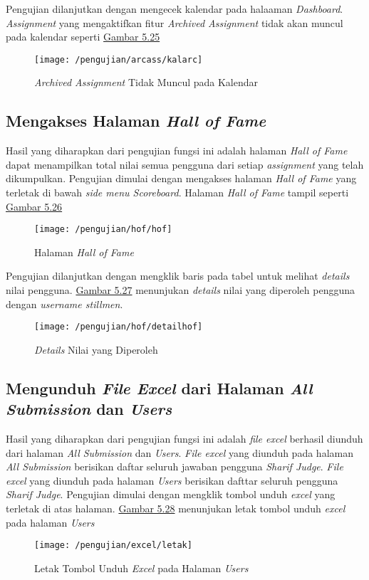 	Pengujian dilanjutkan dengan mengecek kalendar pada halaaman \textit{Dashboard}. \textit{Assignment} yang mengaktifkan fitur \textit{Archived Assignment} tidak akan muncul pada kalendar seperti \hyperref[fig:listarc]{Gambar 5.25}
	\begin{figure}[H]
		\centering  
		\texttt{[image: /pengujian/arcass/kalarc]}  
		\caption[\textit{Archived Assignment} Tidak Muncul pada Kalendar]{\textit{Archived Assignment} Tidak Muncul pada Kalendar} 
		\label{fig:kalarc} 
	\end{figure}

	\subsection{Mengakses Halaman \textit{Hall of Fame}}
	Hasil yang diharapkan dari pengujian fungsi ini adalah halaman \textit{Hall of Fame} dapat menampilkan total nilai semua pengguna dari setiap \textit{assignment} yang telah dikumpulkan. Pengujian dimulai dengan mengakses halaman \textit{Hall of Fame} yang terletak di bawah \textit{side menu Scoreboard}. Halaman \textit{Hall of Fame} tampil seperti \hyperref[fig:halhof]{Gambar 5.26}
	\begin{figure}[H]
		\centering  
		\texttt{[image: /pengujian/hof/hof]}  
		\caption[Halaman \textit{Hall of Fame}]{Halaman \textit{Hall of Fame}} 
		\label{fig:halhof} 
	\end{figure}

	Pengujian dilanjutkan dengan mengklik baris pada tabel untuk melihat \textit{details} nilai pengguna. \hyperref[fig:dethof]{Gambar 5.27} menunjukan \textit{details} nilai yang diperoleh pengguna dengan \textit{username stillmen}.
	\begin{figure}[H]
		\centering  
		\texttt{[image: /pengujian/hof/detailhof]}  
		\caption[\textit{Details} Nilai yang Diperoleh]{\textit{Details} Nilai yang Diperoleh} 
		\label{fig:dethof} 
	\end{figure}

	\subsection{Mengunduh \textit{File Excel} dari Halaman \textit{All Submission} dan \textit{Users}}
	Hasil yang diharapkan dari pengujian fungsi ini adalah \textit{file excel} berhasil diunduh dari halaman \textit{All Submission} dan \textit{Users}. \textit{File excel} yang diunduh pada halaman \textit{All Submission} berisikan daftar seluruh jawaban pengguna \textit{Sharif Judge}. \textit{File excel} yang diunduh pada halaman \textit{Users} berisikan dafttar seluruh pengguna \textit{Sharif Judge}. Pengujian dimulai dengan mengklik tombol unduh \textit{excel} yang terletak di atas halaman. \hyperref[fig:unduh]{Gambar 5.28} menunjukan letak tombol unduh \textit{excel} pada halaman \textit{Users}
	\begin{figure}[H]
		\centering  
		\texttt{[image: /pengujian/excel/letak]}  
		\caption[Letak Tombol Unduh \textit{Excel} pada Halaman \textit{Users}]{Letak Tombol Unduh \textit{Excel} pada Halaman \textit{Users}} 
		\label{fig:unduh} 
	\end{figure}

